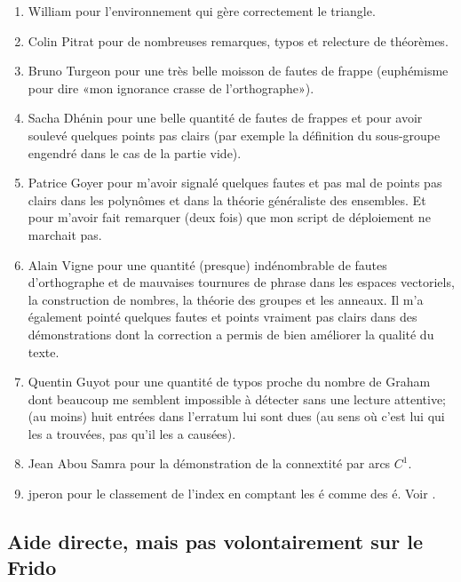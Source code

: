 \begin{enumerate}
	\item
	      William pour l'environnement  qui gère correctement le triangle.
	\item
	      Colin Pitrat pour de nombreuses remarques, typos et relecture de théorèmes.
	\item
	      Bruno Turgeon pour une très belle moisson de fautes de frappe (euphémisme pour dire «mon ignorance crasse de l'orthographe»).
	\item
	      Sacha Dhénin pour une belle quantité de fautes de frappes et pour avoir soulevé quelques points pas clairs (par exemple la définition du sous-groupe engendré dans le cas de la partie vide).
	\item
	      Patrice Goyer pour m'avoir signalé quelques fautes et pas mal de points pas clairs dans les polynômes et dans la théorie généraliste des ensembles. Et pour m'avoir fait remarquer (deux fois) que mon script de déploiement ne marchait pas.
	\item
	      Alain Vigne pour une quantité (presque) indénombrable de fautes d'orthographe et de mauvaises tournures de phrase dans les espaces vectoriels, la construction de nombres, la théorie des groupes et les anneaux. Il m'a également pointé quelques fautes et points vraiment pas clairs dans des démonstrations dont la correction a permis de bien améliorer la qualité du texte.
	\item
	      Quentin Guyot pour une quantité de typos proche du nombre de Graham dont beaucoup me semblent impossible à détecter sans une lecture attentive; (au moins) huit entrées dans l'erratum lui sont dues (au sens où c'est lui qui les a trouvées, pas qu'il les a causées).
	\item
	      Jean Abou Samra pour la démonstration de la connextité par arcs \( C^1\).
	\item
	      jperon pour le classement de l'index en comptant les é comme des é. Voir \cite{BIBooHVJLooVHqAss}.
\end{enumerate}

\subsection{Aide directe, mais pas volontairement sur le Frido}
\label{SUBooINTROremerciementsDirecte}

